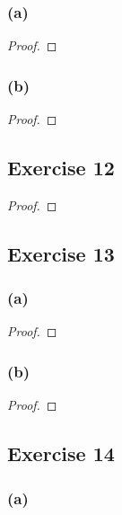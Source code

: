 \documentclass[14pt]{extarticle}
\begin{document}
\subsubsection{(a)}

\begin{proof}

\end{proof}

\subsubsection{(b)}

\begin{proof}

\end{proof}

\subsection{Exercise 12}

\begin{proof}

\end{proof}

\subsection{Exercise 13}

\subsubsection{(a)}

\begin{proof}

\end{proof}

\subsubsection{(b)}

\begin{proof}

\end{proof}

\subsection{Exercise 14}

\subsubsection{(a)}
\end{document}
